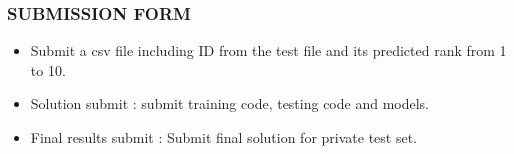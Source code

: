 \documentclass[11pt]{beamer}
\begin{document}
\begin{frame}
\frametitle{SUBMISSION FORM}
\begin{itemize}
	\pause\item Submit a csv file including ID from the test file and its predicted rank from 1 to 10.
	\pause\item Solution submit : submit training code, testing code and models.
	\pause\item Final results submit : Submit final solution for private test set.
\end{itemize}
\end{frame}
\end{document}
